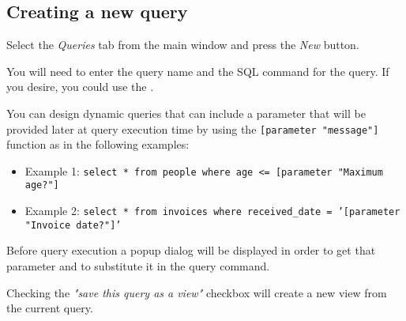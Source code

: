 \subsection{Creating a new query}
Select the \emph{Queries} tab from the main window and press the \emph{New} button.

You will need to enter the query name and the SQL command for the query. If you
desire, you could use the .

You can design dynamic queries that can include a parameter that will be
provided later at query execution time by using the
\texttt{[parameter "message"]} function as in the following examples:

\begin{itemize}
\item{Example 1:} \texttt{select * from people where age <= [parameter "Maximum age?"]}
\item{Example 2:} \texttt{select * from invoices where received\_date = '[parameter "Invoice date?"]'}
\end{itemize}

Before query execution a popup dialog will be displayed in order to get that parameter and to substitute it in the query command.

Checking the \emph{"save this query as a view"} checkbox will create a new view from the current query.
